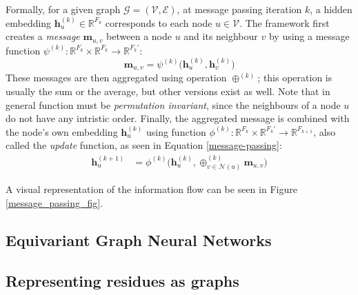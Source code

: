 Formally, for a given graph $\mathcal{G} = (\mathcal{V}, \mathcal{E})$, at message passing iteration $k$, a hidden embedding $\textbf{h}_u^{(k)} \in \mathbb{R}^{F_k}$ corresponds to each node $u \in \mathcal{V}$. 
The framework first creates a \textit{message} $\mathbf{m}_{u,v}$ between a node $u$ and its neighbour $v$ by using a message function $\psi^{(k)}: \mathbb{R}^{F_k}\times\mathbb{R}^{F_k} \rightarrow \mathbb{R}^{F_{k}'}$:
\begin{equation}
    \mathbf{m}_{u, v} = \psi^{(k)}\Big(\textbf{h}_{u}^{(k)}, \textbf{h}_v^{(k)}\Big)
\end{equation}
These messages are then aggregated using operation $\oplus^{(k)}$; 
this operation is usually the sum or the average, but other versions exist as well. Note that in general function must be \textit{permutation invariant}, since the neighbours of a node $u$ do not have any intristic order.
Finally, the aggregated message is combined with the node's own embedding $\mathbf{h}_u^{(k)}$ using function $\phi^{(k)}:\mathbb{R}^{F_k} \times \mathbb{R}^{F_{k}'} \rightarrow \mathbb{R}^{F_{k+1}}$, also called the \textit{update} function, as seen in Equation \ref{message-passing}:
\begin{align}
    \textbf{h}_u^{(k+1)} &= \phi^{(k)}\Big(\textbf{h}_u^{(k)}, \oplus_{v\in \mathcal{N}(u)}^{(k)}\mathbf{m}_{u,v}\Big)
\label{message-passing}
\end{align}

A visual representation of the information flow can be seen in Figure \ref{message_passing_fig}.

\subsection{Equivariant Graph Neural Networks}
\subsection{Representing residues as graphs}
